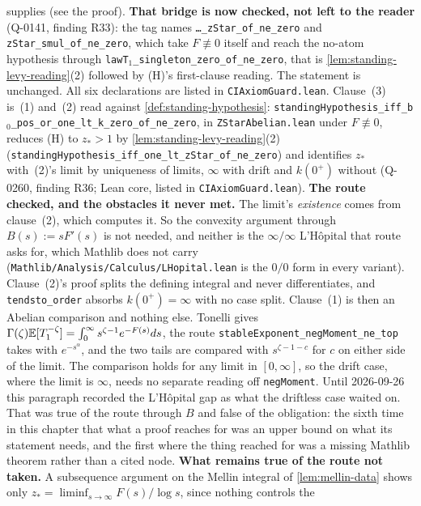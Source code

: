 \begin{lemma}
{supplies (see the proof). \textbf{That bridge is now checked, not left to the reader} (Q-0141,
finding R33): the tag names \texttt{\ldots\_zStar\_of\_ne\_zero} and \texttt{zStar\_smul\_of\_ne\_zero},
which take $F \not\equiv 0$ itself and reach the no-atom hypothesis through
\texttt{lawT}$_1$\texttt{\_singleton\_zero\_of\_ne\_zero}, that is \ref{lem:standing-levy-reading}(2)
followed by (H)'s first-clause reading. The statement is unchanged. All six declarations are listed
in \texttt{CIAxiomGuard.lean}.
Clause~(3) is~(1) and~(2) read against \ref{def:standing-hypothesis}:
\texttt{standingHypothesis\_iff\_b}$_0$\texttt{\_pos\_or\_one\_lt\_k\_zero\_of\_ne\_zero}, in
\texttt{ZStarAbelian.lean} under $F \not\equiv 0$, reduces (H) to $z_* > 1$ by
\ref{lem:standing-levy-reading}(2) (\texttt{standingHypothesis\_iff\_one\_lt\_zStar\_of\_ne\_zero})
and identifies $z_*$ with~(2)'s limit by uniqueness of limits, $\infty$ with drift and $k(0^+)$
without (Q-0260, finding R36; Lean core, listed in \texttt{CIAxiomGuard.lean}).
\textbf{The route checked, and the obstacles it never met.} The limit's \emph{existence} comes from
clause~(2), which computes it. So the convexity argument through $B(s) := sF'(s)$ is not needed, and
neither is the $\infty/\infty$ L'H\^opital that route asks for, which Mathlib does not carry
(\texttt{Mathlib/Analysis/Calculus/LHopital.lean} is the $0/0$ form in every variant). Clause~(2)'s
proof splits the defining integral and never differentiates, and \texttt{tendsto\_order} absorbs
$k(0^+) = \infty$ with no case split. Clause~(1) is then an Abelian comparison and nothing else.
Tonelli gives $\Gamma(\zeta)\mathbb{E}[T_1^{-\zeta}] = \int_0^\infty s^{\zeta-1}e^{-F(s)}ds$, the route
\texttt{stableExponent\_negMoment\_ne\_top} takes with $e^{-s^\alpha}$, and the two tails are
compared with $s^{\zeta-1-c}$ for $c$ on either side of the limit. The comparison holds for any limit
in $[0,\infty]$, so the drift case, where the limit is $\infty$, needs no separate reading off
\texttt{negMoment}. Until 2026-09-26 this paragraph recorded the L'H\^opital gap as what the
driftless case waited on. That was true of the route through $B$ and false of the obligation: the
sixth time in this chapter that what a proof reaches for was an upper bound on what its statement
needs, and the first where the thing reached for was a missing Mathlib theorem rather than a cited
node.
\textbf{What remains true of the route not taken.} A subsequence argument on the Mellin integral of
\ref{lem:mellin-data} shows only $z_* = \liminf_{s\to\infty} F(s)/\log s$, since nothing controls the
}
\end{lemma}
